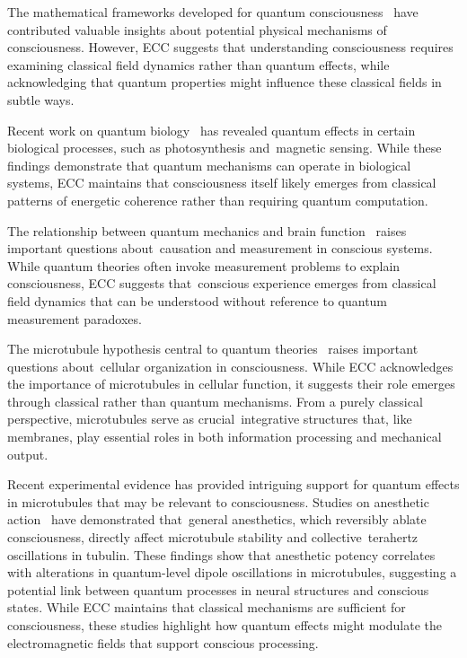 The mathematical frameworks developed for quantum consciousness~\cite{Hagan2002} have contributed valuable insights about potential physical mechanisms of consciousness. However, ECC suggests that understanding consciousness requires examining classical field dynamics rather than quantum effects, while acknowledging that quantum properties might influence these classical fields in subtle ways.

Recent work on quantum biology~\cite{Koch2006, hunt2024electromagnetic} has revealed quantum effects in certain biological processes, such as photosynthesis and~magnetic sensing. While these findings demonstrate that quantum mechanisms can operate in biological systems, ECC maintains that consciousness itself likely emerges from classical patterns of energetic coherence rather than requiring quantum computation.

The relationship between quantum mechanics and brain function~\cite{Stapp2009, Seth2021} raises important questions about~causation and measurement in conscious systems. While quantum theories often invoke measurement problems to explain consciousness, ECC suggests that~conscious experience emerges from classical field dynamics that can be understood without reference to quantum measurement paradoxes.

The microtubule hypothesis central to quantum theories~\cite{Hameroff2014, Pinotsis2023Cytoelectric} raises important questions about~cellular organization in consciousness. While ECC acknowledges the importance of microtubules in cellular function, it suggests their role emerges through classical rather than quantum mechanisms. From a purely classical perspective, microtubules serve as crucial~integrative structures that, like membranes, play essential roles in both information processing and mechanical output.

Recent experimental evidence has provided intriguing support for quantum effects in microtubules that may be relevant to consciousness. Studies on anesthetic action~\cite{Craddock2017, Emerson2013} have demonstrated that~general anesthetics, which reversibly ablate consciousness, directly affect microtubule stability and collective~terahertz oscillations in tubulin. These findings show that anesthetic potency correlates with alterations in quantum-level dipole oscillations in microtubules, suggesting a potential link between quantum processes in neural structures and conscious states. While ECC maintains that classical mechanisms are sufficient for consciousness, these studies highlight how quantum effects might modulate the electromagnetic fields that support conscious processing.

